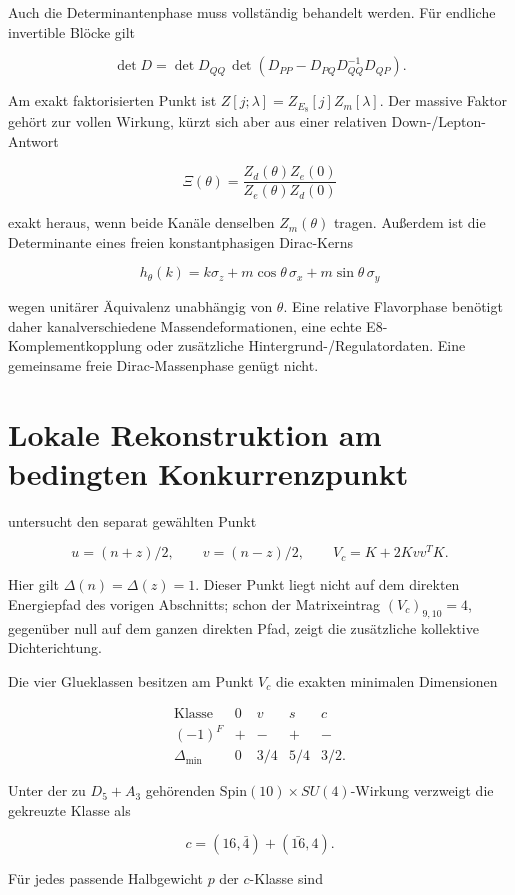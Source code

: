 Auch die Determinantenphase muss vollständig behandelt werden. Für endliche invertible Blöcke gilt

\[
\det D=\det D_{QQ}\,
\det\!\left(D_{PP}-D_{PQ}D_{QQ}^{-1}D_{QP}\right).
\]

Am exakt faktorisierten Punkt ist \(Z[j;\lambda]=Z_{E_8}[j]Z_m[\lambda]\). Der massive Faktor gehört zur vollen Wirkung, kürzt sich aber aus einer relativen Down-/Lepton-Antwort

\[
\Xi(\theta)=\frac{Z_d(\theta)Z_e(0)}{Z_e(\theta)Z_d(0)}
\]

exakt heraus, wenn beide Kanäle denselben \(Z_m(\theta)\) tragen. Außerdem ist die Determinante eines freien konstantphasigen Dirac-Kerns

\[
h_\theta(k)=k\sigma_z+m\cos\theta\,\sigma_x+m\sin\theta\,\sigma_y
\]

wegen unitärer Äquivalenz unabhängig von \(\theta\). Eine relative Flavorphase benötigt daher kanalverschiedene Massendeformationen, eine echte E8-Komplementkopplung oder zusätzliche Hintergrund-/Regulatordaten. Eine gemeinsame freie Dirac-Massenphase genügt nicht.

\section{Lokale Rekonstruktion am bedingten Konkurrenzpunkt}

 untersucht den separat gewählten Punkt

\[
u=(n+z)/2,\qquad v=(n-z)/2,\qquad
V_c=K+2Kvv^TK.
\]

Hier gilt \(\Delta(n)=\Delta(z)=1\). Dieser Punkt liegt nicht auf dem direkten Energiepfad des vorigen Abschnitts; schon der Matrixeintrag \((V_c)_{9,10}=4\), gegenüber null auf dem ganzen direkten Pfad, zeigt die zusätzliche kollektive Dichterichtung.

Die vier Glueklassen besitzen am Punkt \(V_c\) die exakten minimalen Dimensionen

\[
\begin{array}{c|cccc}
\text{Klasse}&0&v&s&c\\ \hline
(-1)^F&+&-&+&-\\
\Delta_{\min}&0&3/4&5/4&3/2.
\end{array}
\]

Unter der zu \(D_5+A_3\) gehörenden \(\mathrm{Spin}(10)\times SU(4)\)-Wirkung verzweigt die gekreuzte Klasse als

\[
c=(16,\bar4)+(\bar{16},4).
\]

Für jedes passende Halbgewicht \(p\) der \(c\)-Klasse sind

